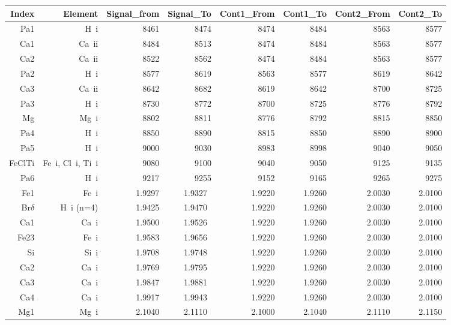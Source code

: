\begin{appendix}
\begin{table*}
\begin{center}
\begin{tabular}{rrrrrrrr}
  \hline
Index & Element & Signal\_from & Signal\_To & Cont1\_From & Cont1\_To & Cont2\_From & Cont2\_To \\ 
  \hline
  Pa1 & H~{\sc i}   & 8461 & 8474 & 8474 & 8484 & 8563 & 8577 \\ 
  Ca1 & Ca~{\sc ii} & 8484 & 8513 & 8474 & 8484 & 8563 & 8577 \\ 
  Ca2 & Ca~{\sc ii} & 8522 & 8562  & 8474 & 8484 & 8563 & 8577 \\ 
  Pa2 & H~{\sc i}   & 8577 & 8619 & 8563 & 8577 & 8619 & 8642 \\ 
  Ca3 & Ca~{\sc ii} & 8642 & 8682 & 8619 & 8642 & 8700 & 8725 \\ 
  Pa3 & H~{\sc i}   & 8730 & 8772 & 8700 & 8725 & 8776 & 8792 \\ 
  Mg  & Mg~{\sc i}  & 8802 & 8811 & 8776 & 8792 & 8815 & 8850 \\ 
  Pa4 & H~{\sc i}   & 8850 & 8890 & 8815 & 8850 & 8890 & 8900 \\ 
  Pa5 & H~{\sc i}   & 9000 & 9030 & 8983 & 8998 & 9040 & 9050 \\
  FeClTi & Fe~{\sc i}, Cl~{\sc i}, Ti~{\sc i} &9080 & 9100 & 9040 & 9050 & 9125 & 9135 \\
  Pa6 & H~{\sc i}   &9217 & 9255 & 9152 & 9165 & 9265 & 9275 \\
Fe1         & Fe{~\sc i}     & 1.9297 & 1.9327~& 1.9220 & 1.9260 & 2.0030 & 2.0100 \\
Br$\delta$  & H{~\sc i} (n=4)& 1.9425 & 1.9470~& 1.9220 & 1.9260 & 2.0030 & 2.0100 \\
Ca1         & Ca{~\sc i}     & 1.9500 & 1.9526~& 1.9220 & 1.9260 & 2.0030 & 2.0100 \\
Fe23        & Fe{~\sc i}     & 1.9583 & 1.9656~& 1.9220 & 1.9260 & 2.0030 & 2.0100 \\
Si          & Si{~\sc i}     & 1.9708 & 1.9748~& 1.9220 & 1.9260 & 2.0030 & 2.0100 \\
Ca2         & Ca{~\sc i}     & 1.9769 & 1.9795~& 1.9220 & 1.9260 & 2.0030 & 2.0100 \\
Ca3         & Ca{~\sc i}     & 1.9847 & 1.9881~& 1.9220 & 1.9260 & 2.0030 & 2.0100 \\
Ca4         & Ca{~\sc i}     & 1.9917 & 1.9943~& 1.9220 & 1.9260 & 2.0030 & 2.0100 \\
Mg1         & Mg{~\sc i}     & 2.1040 & 2.1110~& 2.1000 & 2.1040 & 2.1110 & 2.1150 \\

\end{tabular}
\end{center}
\end{table*}
\end{appendix}
